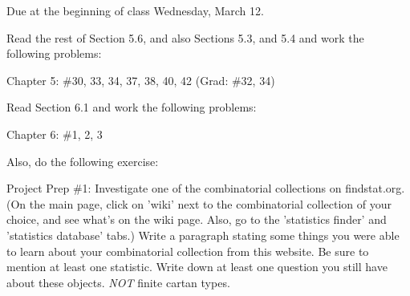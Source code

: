 \documentclass{article}
\begin{document}
Due at the beginning of class Wednesday, March 12.

Read the rest of Section 5.6, and also Sections 5.3, and 5.4 and work the following problems:

Chapter 5: \#30, 33, 34, 37, 38, 40, 42 (Grad: \#32, 34)

Read Section 6.1 and work the following problems:

Chapter 6: \#1, 2, 3

Also, do the following exercise:

Project Prep \#1: Investigate one of the combinatorial collections on findstat.org. (On the main page, click on 'wiki' next to the combinatorial collection of your choice, and see what's on the wiki page. Also, go to the 'statistics finder' and 'statistics database' tabs.) Write a paragraph stating some things you were able to learn about your combinatorial collection from this website. Be sure to mention at least one statistic. Write down at least one question you still have about these objects. \emph{NOT} finite cartan types.
\end{document}
